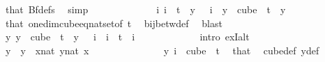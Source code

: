\begin{isabellebody}
\ that\ Bf{\isacharunderscore}{\kern0pt}defs\ \isamarkupfalse%
\ simp\isanewline
\ \ \ \ \ \ \ \ \ \ \isamarkupfalse%
\ \isamarkupfalse%
\ {\isachardoublequoteopen}{\isasymexists}{\isacharbang}{\kern0pt}i{\isachardot}{\kern0pt}\ i\ {\isacharless}{\kern0pt}\ t\ {\isasymand}\ y\ {}\ {\isacharequal}{\kern0pt}\ i{\isachardoublequoteclose}\ \ {\isachardoublequoteopen}y\ {\isasymin}\ cube\ {}\ t{\isachardoublequoteclose}\ \ y\ \isamarkupfalse%
\ that\ one{\isacharunderscore}{\kern0pt}dim{\isacharunderscore}{\kern0pt}cube{\isacharunderscore}{\kern0pt}eq{\isacharunderscore}{\kern0pt}nat{\isacharunderscore}{\kern0pt}set{\isacharbrackleft}{\kern0pt}of\ {\isachardoublequoteopen}t{\isachardoublequoteclose}{\isacharbrackright}{\kern0pt}\ \isamarkupfalse%
\ bij{\isacharunderscore}{\kern0pt}betw{\isacharunderscore}{\kern0pt}def\ \isamarkupfalse%
\ blast\isanewline
\ \ \ \ \ \ \ \ \ \ \isamarkupfalse%
\ \isamarkupfalse%
\ {\isachardoublequoteopen}{\isasymexists}{\isacharbang}{\kern0pt}y{\isachardot}{\kern0pt}\ y\ {\isasymin}\ cube\ {}\ t\ {\isasymand}\ y\ {}\ {\isacharequal}{\kern0pt}\ i{\isachardoublequoteclose}\ \ {\isachardoublequoteopen}i\ {\isacharless}{\kern0pt}\ t{\isachardoublequoteclose}\ \ i\ \isanewline
\ \ \ \ \ \ \ \ \ \ \isamarkupfalse%
\ {\isacharparenleft}{\kern0pt}intro\ ex{}I{\isacharunderscore}{\kern0pt}alt{\isacharparenright}{\kern0pt}\isanewline
\ \ \ \ \ \ \ \ \ \ \ \ \isamarkupfalse%
\ y\ \ {\isachardoublequoteopen}y\ {\isasymequiv}\ {\isacharparenleft}{\kern0pt}{\isasymlambda}x{\isacharcolon}{\kern0pt}{\isacharcolon}{\kern0pt}nat{\isachardot}{\kern0pt}\ {\isasymlambda}y{\isasymin}{\isacharbraceleft}{\kern0pt}{\isachardot}{\kern0pt}{\isachardot}{\kern0pt}{\isacharless}{\kern0pt}{}{\isacharcolon}{\kern0pt}{\isacharcolon}{\kern0pt}nat{\isacharbraceright}{\kern0pt}{\isachardot}{\kern0pt}\ x{\isacharparenright}{\kern0pt}{\isachardoublequoteclose}\ \isanewline
\ \ \ \ \ \ \ \ \ \ \ \ \isamarkupfalse%
\ {\isachardoublequoteopen}y\ i\ {\isasymin}\ {\isacharparenleft}{\kern0pt}cube\ {}\ t{\isacharparenright}{\kern0pt}{\isachardoublequoteclose}\ \isamarkupfalse%
\ that\ \isamarkupfalse%
\ cube{\isacharunderscore}{\kern0pt}def\ y{\isacharunderscore}{\kern0pt}def\ \isamarkupfalse%

\end{isabellebody}
